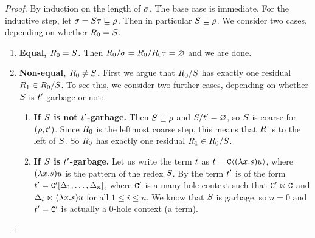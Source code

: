 \begin{proof}
By induction on the length of $\sigma$. The base case is immediate.
For the inductive step, let $\sigma = S \tau \sqsubseteq \rho$.
Then in particular $S \sqsubseteq \rho$.
We consider two cases, depending on whether $R_0 = S$.
\begin{enumerate}
\item {\bf Equal, $R_0 = S$.}
  Then $R_0/\sigma = R_0/R_0\tau = \varnothing$ and we are done.
\item {\bf Non-equal, $R_0 \neq S$.}
  First we argue that $R_0/S$ has exactly one residual $R_1 \in R_0/S$.
  To see this, we consider two further cases, depending on whether
  $S$ is $t'$-garbage or not:
  \begin{enumerate}
  \item {\bf If $S$ is not $t'$-garbage.}
    Then $S \sqsubseteq \rho$ and $S/t' = \varnothing$, so $S$ is coarse for $(\rho,t')$.
    Since $R_0$ is the leftmost coarse step, this means that $R$ is to the left of $S$.
    So $R_0$ has exactly one residual $R_1 \in R_0/S$.
  \item {\bf If $S$ is $t'$-garbage.}
    Let us write the term $t$ as $t = \mathtt{C}\langle(\lambda x. s)u\rangle$, where
    $(\lambda x. s)u$ is the pattern of the redex $S$.
    By 
    the term $t'$ is of the form $t' = \mathtt{C}'[\Delta_1,\hdots,\Delta_n]$,
    where $\mathtt{C}'$ is a many-hole context such that $\mathtt{C}' \mathrel{\ltimes} \mathtt{C}$
    and $\Delta_i \mathrel{\ltimes} (\lambda x. s)u$ for all $1 \leq i \leq n$.
    We know that $S$ is garbage, so $n = 0$ and $t' = \mathtt{C}'$ is actually
    a $0$-hole context (\ie a term).


\end{enumerate}
\end{enumerate}
\end{proof}
